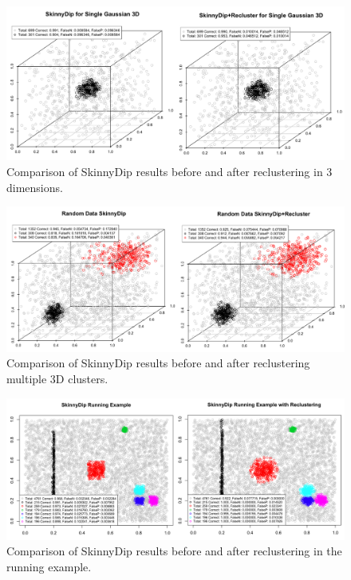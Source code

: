 \documentclass{sig-alternate-05-2015}
\begin{document}
\begin{figure}[t]
\centering
\includegraphics[width=\textwidth]{images/3Dcompare}
\caption{Comparison of SkinnyDip results before and after reclustering in 3 dimensions.}
\label{fig:3Dcompare}
\end{figure}

\begin{figure}[t]
\centering
\includegraphics[width=\textwidth]{images/multicompare}
\caption{Comparison of SkinnyDip results before and after reclustering multiple 3D clusters.}
\label{fig:multicompare}
\end{figure}

\begin{figure}[t]
\centering
\includegraphics[width=\textwidth]{images/Runningcompare}
\caption{Comparison of SkinnyDip results before and after reclustering in the running example.}
\label{fig:runningcompare}
\end{figure}
\end{document}
